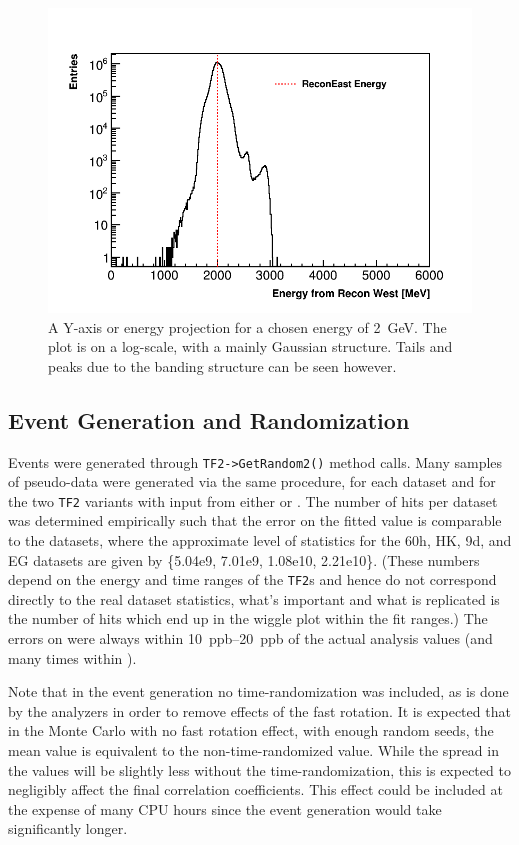 \begin{figure}[]
\centering
\includegraphics[width=.7\textwidth]{ReconEastvWest_Projection}
\caption{A Y-axis or \RW energy projection for a chosen \RE energy of \SI{2}{\GeV}. The plot is on a log-scale, with a mainly Gaussian structure. Tails and peaks due to the banding structure can be seen however.}
\label{fig:EvWprojection}
\end{figure}




\subsection{Event Generation and Randomization}


Events were generated through \texttt{TF2->GetRandom2()} method calls. Many samples of pseudo-data were generated via the same procedure, for each dataset and for the two \texttt{TF2} variants with input from either \RE or \RW. The number of hits per dataset was determined empirically such that the error on the fitted \R value is comparable to the \Rone datasets, where the approximate level of statistics for the 60h, HK, 9d, and EG datasets are given by \{5.04e9, 7.01e9, 1.08e10, 2.21e10\}. (These numbers depend on the energy and time ranges of the \texttt{TF2}s and hence do not correspond directly to the real dataset statistics, what's important and what is replicated is the number of hits which end up in the wiggle plot within the fit ranges.) The errors on \R were always within \SIrange{10}{20}{ppb} of the actual analysis values (and many times within ).

Note that in the event generation no time-randomization was included, as is done by the analyzers in order to remove effects of the fast rotation. It is expected that in the Monte Carlo with no fast rotation effect, with enough random seeds, the mean \R value is equivalent to the non-time-randomized \R value. While the spread in the \R values will be slightly less without the time-randomization, this is expected to negligibly affect the final correlation coefficients. This effect could be included at the expense of many CPU hours since the event generation would take significantly longer.

